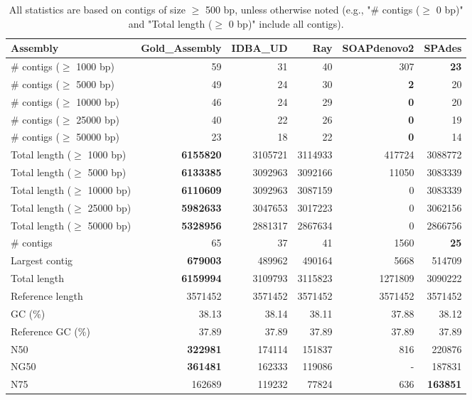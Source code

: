 \documentclass[12pt,a4paper]{article}
\begin{document}
\begin{table}[ht]
\begin{center}
\caption{All statistics are based on contigs of size $\geq$ 500 bp, unless otherwise noted (e.g., "\# contigs ($\geq$ 0 bp)" and "Total length ($\geq$ 0 bp)" include all contigs).}
\begin{tabular}{|l*{5}{|r}|}
\hline
Assembly & Gold\_Assembly & IDBA\_UD & Ray & SOAPdenovo2 & SPAdes \\ \hline
\# contigs ($\geq$ 1000 bp) & 59 & 31 & 40 & 307 & {\bf 23} \\ \hline
\# contigs ($\geq$ 5000 bp) & 49 & 24 & 30 & {\bf 2} & 20 \\ \hline
\# contigs ($\geq$ 10000 bp) & 46 & 24 & 29 & {\bf 0} & 20 \\ \hline
\# contigs ($\geq$ 25000 bp) & 40 & 22 & 26 & {\bf 0} & 19 \\ \hline
\# contigs ($\geq$ 50000 bp) & 23 & 18 & 22 & {\bf 0} & 14 \\ \hline
Total length ($\geq$ 1000 bp) & {\bf 6155820} & 3105721 & 3114933 & 417724 & 3088772 \\ \hline
Total length ($\geq$ 5000 bp) & {\bf 6133385} & 3092963 & 3092166 & 11050 & 3083339 \\ \hline
Total length ($\geq$ 10000 bp) & {\bf 6110609} & 3092963 & 3087159 & 0 & 3083339 \\ \hline
Total length ($\geq$ 25000 bp) & {\bf 5982633} & 3047653 & 3017223 & 0 & 3062156 \\ \hline
Total length ($\geq$ 50000 bp) & {\bf 5328956} & 2881317 & 2867634 & 0 & 2866756 \\ \hline
\# contigs & 65 & 37 & 41 & 1560 & {\bf 25} \\ \hline
Largest contig & {\bf 679003} & 489962 & 490164 & 5668 & 514709 \\ \hline
Total length & {\bf 6159994} & 3109793 & 3115823 & 1271809 & 3090222 \\ \hline
Reference length & 3571452 & 3571452 & 3571452 & 3571452 & 3571452 \\ \hline
GC (\%) & 38.13 & 38.14 & 38.11 & 37.88 & 38.12 \\ \hline
Reference GC (\%) & 37.89 & 37.89 & 37.89 & 37.89 & 37.89 \\ \hline
N50 & {\bf 322981} & 174114 & 151837 & 816 & 220876 \\ \hline
NG50 & {\bf 361481} & 162333 & 119086 & - & 187831 \\ \hline
N75 & 162689 & 119232 & 77824 & 636 & {\bf 163851} \\ \hline

\end{tabular}
\end{center}
\end{table}
\end{document}
